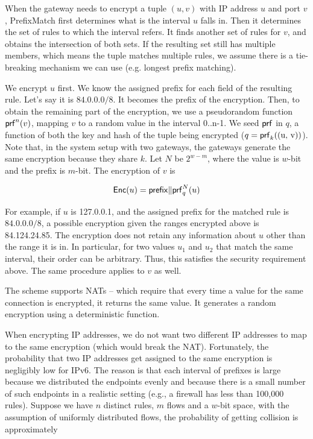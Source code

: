 When the gateway needs to encrypt a tuple $(u, v)$ with IP address $u$ and port $v$, PrefixMatch first determines what is the interval $u$ falls in. Then it determines the set of rules to which the interval refers. It finds another set of rules for $v$, and obtains the intersection of both sets. If the resulting set still has multiple members, which means the tuple matches multiple rules, we assume there is a tie-breaking mechanism we can use (e.g. longest prefix matching). 

We encrypt $u$ first. We know the assigned prefix for each field of the resulting rule. Let's say it is $84.0.0.0/8$. It becomes the prefix of the encryption. Then, to obtain the remaining part of the encryption, we use a pseudorandom function $\mathsf{prf}^n(v)$, mapping $v$ to a random value in the interval 0..n-1. We seed $\mathsf{prf}$ in $q$, a function of both the key and hash of the tuple being encrypted ($q = \mathsf{prf}_k(\text{(u, v)})$). Note that, in the system setup with two gateways, the gateways generate the same encryption because they share $k$. Let $N$ be $2^{w-m}$, where the value is $w$-bit and the prefix is $m$-bit. The encryption of $v$ is

\begin{equation}
\mathsf{Enc}(u) = \mathsf{prefix} \Vert \mathsf{prf}_q^N(u)
\end{equation}

For example, if $u$ is 127.0.0.1, and the assigned prefix for the matched rule is $84.0.0.0/8$, a possible encryption given the ranges encrypted above is 84.124.24.85. The encryption does not retain any information about $u$ other than the range it is in. In particular, for two values $u_1$ and $u_2$ that match the same interval, their order can be arbitrary. Thus, this satisfies the security requirement above. The same procedure applies to $v$ as well.

The scheme supports NATs -- which require that every time a value for the same connection is encrypted, it returns the same value. It generates a random encryption using a deterministic function. 

When encrypting IP addresses, we do not want two different IP addresses to map to the same encryption (which would break the NAT). Fortunately, the probability that two IP addresses get assigned to the same encryption is negligibly low for IPv6.  The reason is that each interval of prefixes is large because we distributed the endpoints evenly and because there is a small number of such endpoints in a realistic setting (e.g., a firewall has less than 100,000 rules). Suppose we have $n$ distinct rules, $m$ flows and a $w$-bit space, with the assumption of uniformly distributed flows, the probability of getting collision is approximately 


